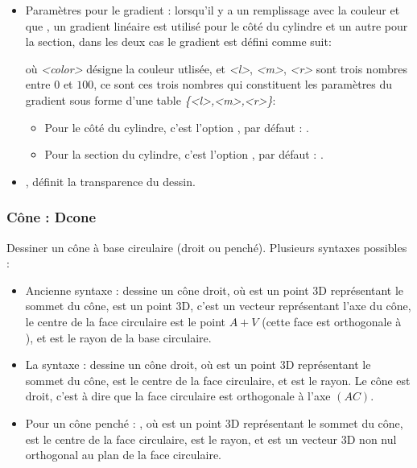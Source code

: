 \begin{itemize}
    \item Paramètres pour le gradient : lorsqu'il y a un remplissage avec la couleur et que , un gradient linéaire est utilisé pour le côté du cylindre et un autre pour la section, dans les deux cas le gradient est défini comme suit:\par
    où \emph{<color>} désigne la couleur utlisée, et \emph{<l>}, \emph{<m>}, \emph{<r>} sont trois nombres entre $0$ et $100$, ce sont ces trois nombres qui constituent les paramètres du gradient sous forme d'une table \emph{\{<l>,<m>,<r>\}}:
        \begin{itemize}
            \item Pour le côté du cylindre, c'est l'option , par défaut : .
            \item Pour la section du cylindre, c'est l'option , par défaut : .
        \end{itemize}
    \item {}, définit la transparence du dessin.
\end{itemize}

\subsubsection{Cône : Dcone}

Dessiner un cône à base circulaire (droit ou penché). Plusieurs syntaxes possibles :
\begin{itemize}
    \item Ancienne syntaxe :  dessine un cône droit, où  est un point 3D représentant le sommet du cône,  est un point 3D, c'est un vecteur représentant l'axe du cône, le centre de la face circulaire est le point $A+V$ (cette face est orthogonale à ), et  est le rayon de la base circulaire.
    
    \item La syntaxe :  dessine un cône droit, où  est un point 3D représentant le sommet du cône,  est le centre de la face circulaire, et  est le rayon. Le cône est droit, c'est à dire que la face circulaire est orthogonale à l'axe $(AC)$.
    
    \item Pour un cône penché : , où  est un point 3D représentant le sommet du cône,  est le centre de la face circulaire,  est le rayon, et  est un vecteur 3D non nul orthogonal au plan de la face circulaire.
\end{itemize}

